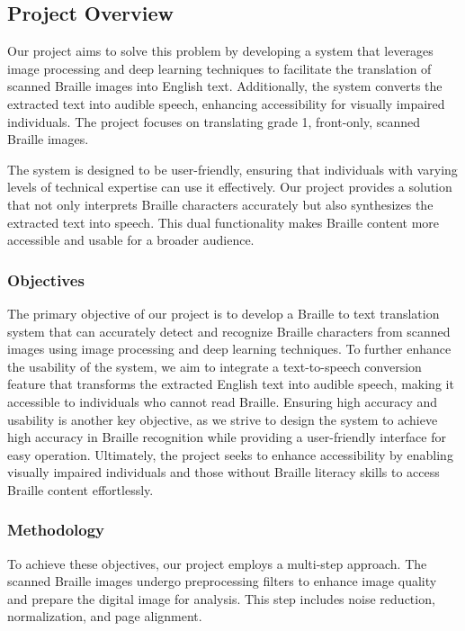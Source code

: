 \subsection{Project Overview}


Our project aims to solve this problem by developing a system that leverages image processing and deep learning techniques to facilitate the translation of scanned Braille images into English text. Additionally, the system converts the extracted text into audible speech, enhancing accessibility for visually impaired individuals. The project focuses on translating grade 1, front-only, scanned Braille images.

The system is designed to be user-friendly, ensuring that individuals with varying levels of technical expertise can use it effectively. Our project provides a solution that not only interprets Braille characters accurately but also synthesizes the extracted text into speech. This dual functionality makes Braille content more accessible and usable for a broader audience.

\subsubsection{Objectives}

The primary objective of our project is to develop a Braille to text translation system that can accurately detect and recognize Braille characters from scanned images using image processing and deep learning techniques. To further enhance the usability of the system, we aim to integrate a text-to-speech conversion feature that transforms the extracted English text into audible speech, making it accessible to individuals who cannot read Braille. Ensuring high accuracy and usability is another key objective, as we strive to design the system to achieve high accuracy in Braille recognition while providing a user-friendly interface for easy operation. Ultimately, the project seeks to enhance accessibility by enabling visually impaired individuals and those without Braille literacy skills to access Braille content effortlessly.

\subsubsection{Methodology}

To achieve these objectives, our project employs a multi-step approach. The scanned Braille images undergo preprocessing filters to enhance image quality and prepare the digital image for analysis. This step includes noise reduction, normalization, and page alignment. 



